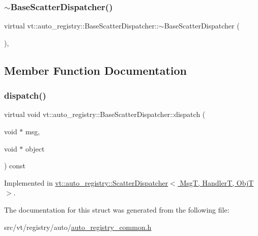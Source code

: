 \subsubsection{\texorpdfstring{$\sim$\+Base\+Scatter\+Dispatcher()}{~BaseScatterDispatcher()}}
{\footnotesize\ttfamily virtual vt\+::auto\+\_\+registry\+::\+Base\+Scatter\+Dispatcher\+::$\sim$\+Base\+Scatter\+Dispatcher (\begin{DoxyParamCaption}{ }\end{DoxyParamCaption})\hspace{0.3cm}{\ttfamily [virtual]}, {\ttfamily [default]}}



\subsection{Member Function Documentation}
\mbox{\label{structvt_1_1auto__registry_1_1_base_scatter_dispatcher_af9efaf266a3a809bfeaba5269f1583b2}} 
\subsubsection{\texorpdfstring{dispatch()}{dispatch()}}
{\footnotesize\ttfamily virtual void vt\+::auto\+\_\+registry\+::\+Base\+Scatter\+Dispatcher\+::dispatch (\begin{DoxyParamCaption}\item[{void $\ast$}]{msg,  }\item[{void $\ast$}]{object }\end{DoxyParamCaption}) const\hspace{0.3cm}{\ttfamily [pure virtual]}}



Implemented in \hyperlink{structvt_1_1auto__registry_1_1_scatter_dispatcher_af0bc28e159a179b15cd964c187d8c85b}{vt\+::auto\+\_\+registry\+::\+Scatter\+Dispatcher$<$ Msg\+T, Handler\+T, Obj\+T $>$}.



The documentation for this struct was generated from the following file\+:\begin{DoxyCompactItemize}
\item 
src/vt/registry/auto/\hyperlink{auto__registry__common_8h}{auto\+\_\+registry\+\_\+common.\+h}\end{DoxyCompactItemize}
